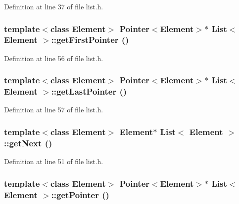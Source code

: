 Definition at line 37 of file list.h.\hypertarget{classList_b019684a93ca7667f242419f23fc3229}{
\subsubsection[{getFirstPointer}]{\setlength{\rightskip}{0pt plus 5cm}template$<$class Element$>$ {\bf Pointer}$<$Element$>$$\ast$ {\bf List}$<$ Element $>$::getFirstPointer ()}}
\label{classList_b019684a93ca7667f242419f23fc3229}




Definition at line 56 of file list.h.\hypertarget{classList_bc5adccd5f9c6e18e753347e27c1e2bb}{
\subsubsection[{getLastPointer}]{\setlength{\rightskip}{0pt plus 5cm}template$<$class Element$>$ {\bf Pointer}$<$Element$>$$\ast$ {\bf List}$<$ Element $>$::getLastPointer ()}}
\label{classList_bc5adccd5f9c6e18e753347e27c1e2bb}




Definition at line 57 of file list.h.\hypertarget{classList_64cac9b28ca614fea3914a4c1e218a47}{
\subsubsection[{getNext}]{\setlength{\rightskip}{0pt plus 5cm}template$<$class Element$>$ Element$\ast$ {\bf List}$<$ Element $>$::getNext ()}}
\label{classList_64cac9b28ca614fea3914a4c1e218a47}




Definition at line 51 of file list.h.\hypertarget{classList_696cc1fe666cd3c0d22d29c38541f8d0}{
\subsubsection[{getPointer}]{\setlength{\rightskip}{0pt plus 5cm}template$<$class Element$>$ {\bf Pointer}$<$Element$>$$\ast$ {\bf List}$<$ Element $>$::getPointer ()}}
\label{classList_696cc1fe666cd3c0d22d29c38541f8d0}




